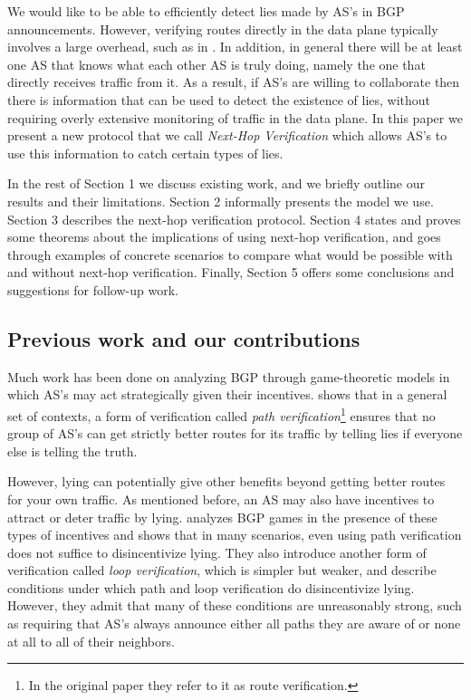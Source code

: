 \documentclass[12pt]{article}
\begin{document}
We would like to be able to efficiently detect lies made by AS's in BGP announcements. However, verifying routes directly in the data plane typically involves a large overhead, such as in \cite{DataPlane}. In addition, in general there will be at least one AS that knows what each other AS is truly doing, namely the one that directly receives traffic from it. As a result, if AS's are willing to collaborate then there is information that can be used to detect the existence of lies, without requiring overly extensive monitoring of traffic in the data plane. In this paper we present a new protocol that we call \emph{Next-Hop Verification} which allows AS's to use this information to catch certain types of lies.

In the rest of Section 1 we discuss existing work, and we briefly outline our results and their limitations. Section 2 informally presents the model we use. Section 3 describes the next-hop verification protocol. Section 4 states and proves some theorems about the implications of using next-hop verification, and goes through examples of concrete scenarios to compare what would be possible with and without next-hop verification. Finally, Section 5 offers some conclusions and suggestions for follow-up work.

\subsection{Previous work and our contributions}
Much work has been done on analyzing BGP through game-theoretic models in which AS's may act strategically given their incentives. \cite{RoutingGames} shows that in a general set of contexts, a form of verification called \emph{path verification}\footnote{In the original paper they refer to it as route verification.}
ensures that no group of AS's can get strictly better routes for its traffic by telling lies if everyone else is telling the truth.

However, lying can potentially give other benefits beyond getting better routes for your own traffic. As mentioned before, an AS may also have incentives to attract or deter traffic by lying. \cite{Attraction} analyzes BGP games in the presence of these types of incentives and shows that in many scenarios, even using path verification does not suffice to disincentivize lying. They also introduce another form of verification called \emph{loop verification}, which is simpler but weaker, and describe conditions under which path and loop verification do disincentivize lying. However, they admit that many of these conditions are unreasonably strong, such as requiring that AS's always announce either all paths they are aware of or none at all to all of their neighbors.
\end{document}
